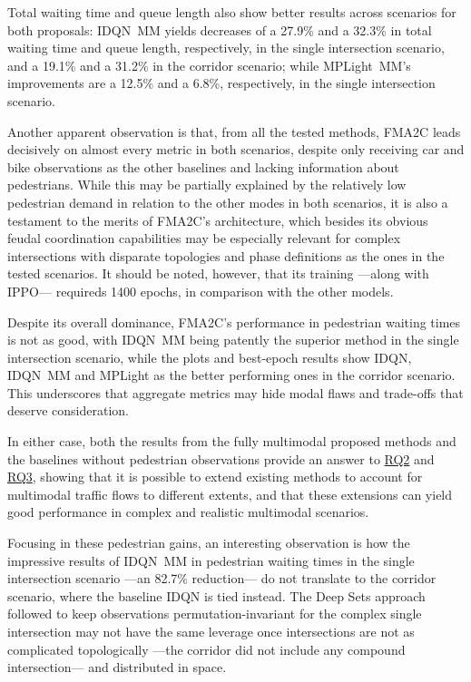 Total waiting time and queue length also show better results across scenarios for both proposals: IDQN~MM yields decreases of a 27.9\% and a 32.3\% in total waiting time and queue length, respectively, in the single intersection scenario, and a 19.1\% and a 31.2\% in the corridor scenario; while MPLight~MM's improvements are a 12.5\% and a 6.8\%, respectively, in the single intersection scenario.

\medskip

\noindent Another apparent observation is that, from all the tested methods, FMA2C leads decisively on almost every metric in both scenarios, despite only receiving car and bike observations as the other baselines and lacking information about pedestrians. While this may be partially explained by the relatively low pedestrian demand in relation to the other modes in both scenarios, it is also a testament to the merits of FMA2C's architecture, which besides its obvious feudal coordination capabilities may be especially relevant for complex intersections with disparate topologies and phase definitions as the ones in the tested scenarios. It should be noted, however, that its training —along with IPPO— requireds 1400 epochs, in comparison with the other models.

Despite its overall dominance, FMA2C's performance in pedestrian waiting times is not as good, with IDQN~MM being patently the superior method in the single intersection scenario, while the plots and best-epoch results show IDQN, IDQN~MM and MPLight as the better performing ones in the corridor scenario. This underscores that aggregate metrics may hide modal flaws and trade-offs that deserve consideration.

In either case, both the results from the fully multimodal proposed methods and the baselines without pedestrian observations provide an answer to \hyperref[sec:rqs]{RQ2} and \hyperref[sec:rqs]{RQ3}, showing that it is possible to extend existing methods to account for multimodal traffic flows to different extents, and that these extensions can yield good performance in complex and realistic multimodal scenarios.

\medskip

\noindent Focusing in these pedestrian gains, an interesting observation is how the impressive results of IDQN~MM in pedestrian waiting times in the single intersection scenario —an 82.7\% reduction— do not translate to the corridor scenario, where the baseline IDQN is tied instead. The Deep Sets approach followed to keep observations permutation-invariant for the complex single intersection may not have the same leverage once intersections are not as complicated topologically —the corridor did not include any compound intersection— and distributed in space.

